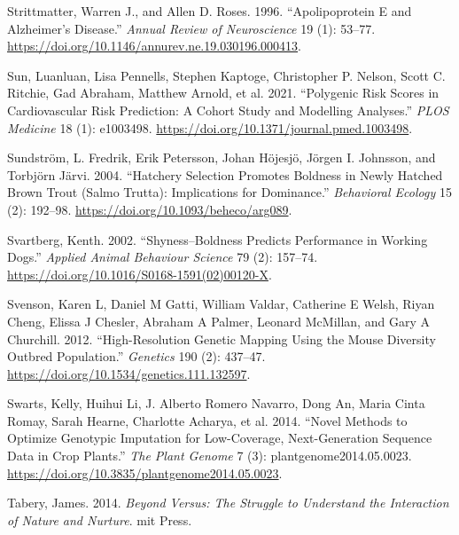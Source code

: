 \documentclass[
]{book}
\newlength{\cslhangindent}
\newlength{\cslentryspacingunit} %
\newenvironment{CSLReferences}[2] %
 {%
  \setlength{\parindent}{0pt}
  \ifodd #1
  \let\oldpar\par
  \def\par{\hangindent=\cslhangindent\oldpar}
  \fi
  \setlength{\parskip}{#2\cslentryspacingunit}
 }%
 {}
\begin{document}
\begin{CSLReferences}{1}{0}
\leavevmode{}%
Strittmatter, Warren J., and Allen D. Roses. 1996. {``Apolipoprotein {E} and {Alzheimer}'s {Disease}.''} \emph{Annual Review of Neuroscience} 19 (1): 53--77. \url{https://doi.org/10.1146/annurev.ne.19.030196.000413}.

\leavevmode{}%
Sun, Luanluan, Lisa Pennells, Stephen Kaptoge, Christopher P. Nelson, Scott C. Ritchie, Gad Abraham, Matthew Arnold, et al. 2021. {``Polygenic Risk Scores in Cardiovascular Risk Prediction: {A} Cohort Study and Modelling Analyses.''} \emph{PLOS Medicine} 18 (1): e1003498. \url{https://doi.org/10.1371/journal.pmed.1003498}.

\leavevmode{}%
Sundström, L. Fredrik, Erik Petersson, Johan Höjesjö, Jörgen I. Johnsson, and Torbjörn Järvi. 2004. {``Hatchery Selection Promotes Boldness in Newly Hatched Brown Trout ({Salmo} Trutta): Implications for Dominance.''} \emph{Behavioral Ecology} 15 (2): 192--98. \url{https://doi.org/10.1093/beheco/arg089}.

\leavevmode{}%
Svartberg, Kenth. 2002. {``Shyness--Boldness Predicts Performance in Working Dogs.''} \emph{Applied Animal Behaviour Science} 79 (2): 157--74. \url{https://doi.org/10.1016/S0168-1591(02)00120-X}.

\leavevmode{}%
Svenson, Karen L, Daniel M Gatti, William Valdar, Catherine E Welsh, Riyan Cheng, Elissa J Chesler, Abraham A Palmer, Leonard McMillan, and Gary A Churchill. 2012. {``High-{Resolution Genetic Mapping Using} the {Mouse Diversity Outbred Population}.''} \emph{Genetics} 190 (2): 437--47. \url{https://doi.org/10.1534/genetics.111.132597}.

\leavevmode{}%
Swarts, Kelly, Huihui Li, J. Alberto Romero Navarro, Dong An, Maria Cinta Romay, Sarah Hearne, Charlotte Acharya, et al. 2014. {``Novel {Methods} to {Optimize Genotypic Imputation} for {Low-Coverage}, {Next-Generation Sequence Data} in {Crop Plants}.''} \emph{The Plant Genome} 7 (3): plantgenome2014.05.0023. \url{https://doi.org/10.3835/plantgenome2014.05.0023}.

\leavevmode{}%
Tabery, James. 2014. \emph{Beyond Versus: {The} Struggle to Understand the Interaction of Nature and Nurture}. {mit Press}.


\end{CSLReferences}
\end{document}
